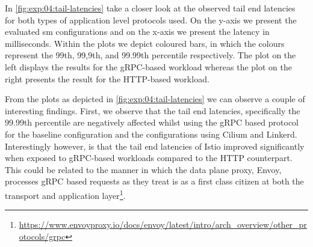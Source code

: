 In \cref{fig:exp:04:tail-latencies} take a closer look at the observed tail end latencies for both types of application level protocols used. On the y-axis we present the evaluated \gls{sm} configurations and on the x-axis we present the latency in milliseconds. Within the plots we depict coloured bars, in which the colours represent the 99th, 99,9th, and 99.99th percentile respectively. The plot on the left displays the results for the gRPC-based workload whereas the plot on the right presents the result for the HTTP-based workload.

From the plots as depicted in \cref{fig:exp:04:tail-latencies} we can observe a couple of interesting findings. First, we observe that the tail end latencies, specifically the 99.99th percentile are negatively affected whilst using the gRPC based protocol for the baseline configuration and the configurations using Cilium and Linkerd. Interestingly however, is that the tail end latencies of Istio improved significantly when exposed to gRPC-based workloads compared to the HTTP counterpart. This could be related to the manner in which the data plane proxy, Envoy, processes gRPC based requests as they treat is as a first class citizen at both the transport and application layer\footnote{\url{https://www.envoyproxy.io/docs/envoy/latest/intro/arch_overview/other_protocols/grpc}}.

